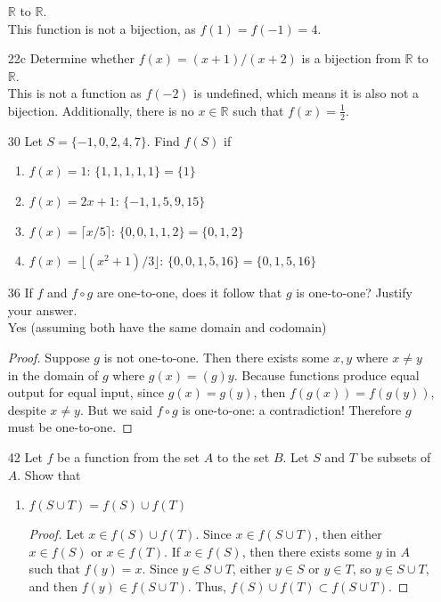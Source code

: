 \documentclass{article}
\begin{document}
\begin{enumerate}
      $\mathbb{R}$ to $\mathbb{R}$.\\
      This function is not a bijection, as $f(1)=f(-1)=4$.
    \item[22c] Determine whether $f(x)=(x+1)/(x+2)$ is a bijection from
      $\mathbb{R}$ to $\mathbb{R}$. \\
      This is not a function as $f(-2)$ is undefined, which means it is
      also not a bijection. Additionally, there is no $x \in \mathbb{R}$
      such that $f(x) = \frac{1}{2}$.
    \item[30] Let $S = \{-1,0,2,4,7\}$. Find $f(S)$ if
      \begin{enumerate}
        \item $f(x) = 1$: $\{1,1,1,1,1\} = \{ 1 \}$
        \item $f(x) = 2x + 1$: $\{-1,1,5,9,15\}$
        \item $f(x) = \lceil x / 5 \rceil$: $\{0,0,1,1,2\} = \{ 0,1,2 \}$
        \item $f(x) = \lfloor (x^2 + 1) / 3 \rfloor$: $\{ 0,0,1,5,16 \} = \{0,1,5,16\}$
      \end{enumerate}
    \item[36] If $f$ and $f \circ g$ are one-to-one, does it follow that $g$ is one-to-one? Justify your answer.\\
      Yes (assuming both have the same domain and codomain)
      \begin{proof}
        Suppose $g$ is not one-to-one. Then there exists some $x,y$ where 
        $x \neq y$ in the domain of $g$ where $g(x)=(g)y$. Because functions
        produce equal output for equal input, since $g(x)=g(y)$, then
        $f(g(x))=f(g(y))$, despite $x \neq y$. But we said $f \circ g$ is
        one-to-one: a contradiction! Therefore $g$ must be one-to-one.
      \end{proof}
    \item[42] Let $f$ be a function from the set $A$ to the set $B$. Let $S$
      and $T$ be subsets of $A$. Show that
      \begin{enumerate}
        \item $f(S \cup T) = f(S) \cup f(T)$
          \begin{proof}
            Let $x \in f(S) \cup f(T)$. Since  $x \in f(S \cup T)$, then either
            $x \in f(S)$ or $x \in f(T)$. If $x \in f(S)$, then there exists some
            $y$ in $A$ such that $f(y)=x$. Since $y \in S \cup T$, either $y \in S$
            or $y \in T$, so $y \in S \cup T$, and then $f(y) \in f(S \cup T)$.
            Thus, $f(S) \cup f(T) \subset f(S \cup T)$.


\end{proof}
\end{enumerate}
\end{enumerate}
\end{document}
